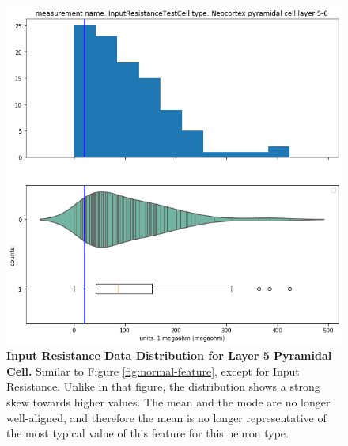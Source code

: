 \begin{figure} 
    \begin{center} 
    \includegraphics[scale=0.8]{figures/skewed_distribution.png}
    \end{center}
    \caption[Example of Skewed  Distribution]{\textbf{Input Resistance Data Distribution for Layer 5 Pyramidal Cell.} Similar to Figure \ref{fig:normal-feature}, except for Input Resistance.
    Unlike in that figure, the distribution shows a strong skew towards higher values.
    The mean and the mode are no longer well-aligned, and therefore the mean is no longer representative of the most typical value of this feature for this neuron type.}
    \label{fig:skewed-feature}
\end{figure}   

    
